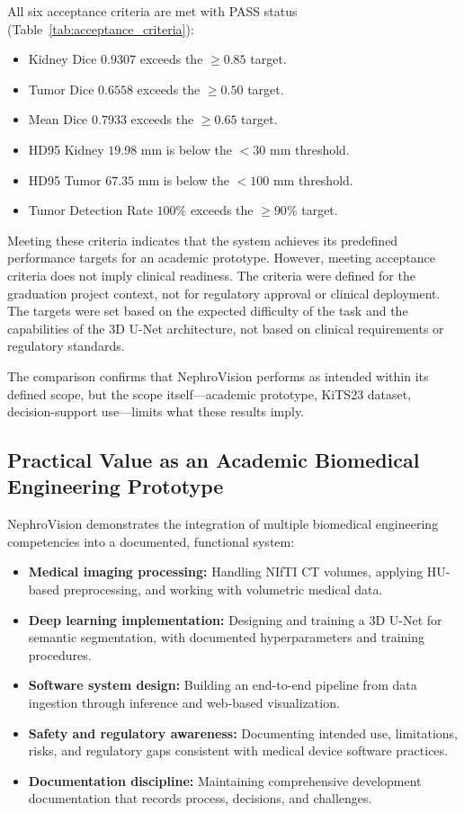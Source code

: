 All six acceptance criteria are met with PASS status (Table~\ref{tab:acceptance_criteria}):

\begin{itemize}
    \item Kidney Dice $0.9307$ exceeds the $\geq 0.85$ target.
    \item Tumor Dice $0.6558$ exceeds the $\geq 0.50$ target.
    \item Mean Dice $0.7933$ exceeds the $\geq 0.65$ target.
    \item HD95 Kidney $19.98$ mm is below the $< 30$ mm threshold.
    \item HD95 Tumor $67.35$ mm is below the $< 100$ mm threshold.
    \item Tumor Detection Rate $100\%$ exceeds the $\geq 90\%$ target.
\end{itemize}

Meeting these criteria indicates that the system achieves its predefined performance targets for an academic prototype. However, meeting acceptance criteria does not imply clinical readiness. The criteria were defined for the graduation project context, not for regulatory approval or clinical deployment. The targets were set based on the expected difficulty of the task and the capabilities of the 3D U-Net architecture, not based on clinical requirements or regulatory standards.

The comparison confirms that NephroVision performs as intended within its defined scope, but the scope itself---academic prototype, KiTS23 dataset, decision-support use---limits what these results imply.

\subsection{Practical Value as an Academic Biomedical Engineering Prototype}

NephroVision demonstrates the integration of multiple biomedical engineering competencies into a documented, functional system:

\begin{itemize}
    \item \textbf{Medical imaging processing:} Handling NIfTI CT volumes, applying HU-based preprocessing, and working with volumetric medical data.
    \item \textbf{Deep learning implementation:} Designing and training a 3D U-Net for semantic segmentation, with documented hyperparameters and training procedures.
    \item \textbf{Software system design:} Building an end-to-end pipeline from data ingestion through inference and web-based visualization.
    \item \textbf{Safety and regulatory awareness:} Documenting intended use, limitations, risks, and regulatory gaps consistent with medical device software practices.
    \item \textbf{Documentation discipline:} Maintaining comprehensive development documentation that records process, decisions, and challenges.
\end{itemize}

